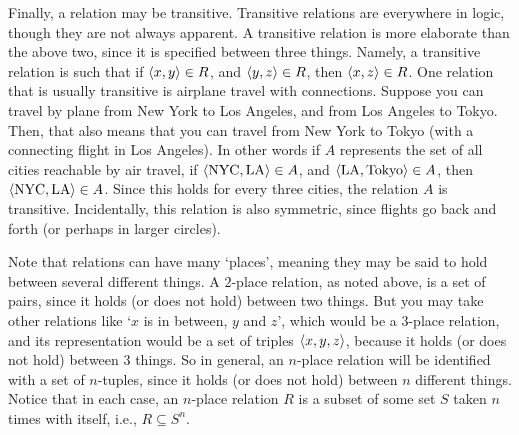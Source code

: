 Finally, a relation may be transitive. Transitive relations are everywhere in logic, though they are not always apparent. A transitive relation is more elaborate than the above two, since it is specified between three things. Namely, a transitive relation is such that if $\langle x, y\rangle \in R$, and $\langle y, z\rangle \in R$, then $\langle x, z\rangle \in R$. One relation that is usually transitive is airplane travel with connections. Suppose you can travel by plane from New York to Los Angeles, and from Los Angeles to Tokyo. Then, that also means that you can travel from New York to Tokyo (with a connecting flight in Los Angeles). In other words if $A$ represents the set of all cities reachable by air travel, if $\langle\text{NYC}, \text{LA}\rangle \in A$, and $\langle\text{LA}, \text{Tokyo}\rangle \in A$, then $\langle\text{NYC}, \text{LA}\rangle \in A$. Since this holds for every three cities, the relation $A$ is transitive. Incidentally, this relation is also symmetric, since flights go back and forth (or perhaps in larger circles).  


Note that relations can have many `places', meaning they may be said to hold between several different things. A $2$-place relation, as noted above, is a set of pairs, since it holds (or does not hold) between two things. But you may take other relations like `$x$ is in between, $y$ and $z$', which would be a $3$-place relation, and its representation would be a set of triples $\langle x, y, z\rangle$, because it holds (or does not hold) between 3 things. So in general, an $n$-place relation will be identified with a set of $n$-tuples, since it holds (or does not hold) between $n$ different things. Notice that in each case, an $n$-place relation $R$ is a subset of some set $S$ taken $n$ times with itself, i.e., $R \subseteq S^n$. 

